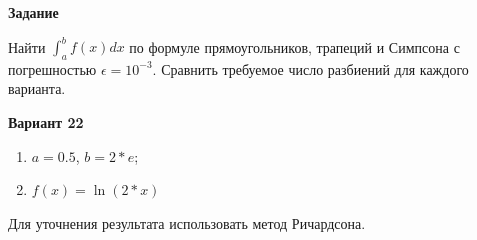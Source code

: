 \textbf{Задание}

Найти $\int_a^b{f(x)dx}$ по  формуле прямоугольников, трапеций и Симпсона с погрешностью $\epsilon = 10^{-3}$. 
Сравнить требуемое число разбиений для каждого варианта.

\textbf{Вариант 22} 
\begin{enumerate}
  \item $a = 0.5$, $b = 2*e$;
  \item $f(x) = \ln(2*x)$
\end{enumerate}

Для уточнения результата использовать метод Ричардсона.
